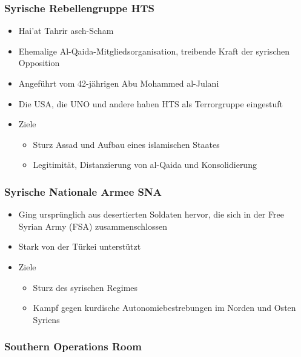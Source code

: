 {}\documentclass[a4paper]{article}
\providecommand{\tightlist}{\setlength{\itemsep}{1mm}\setlength{\parskip}{1mm}}
\begin{document}
\subsubsection{Syrische Rebellengruppe
	HTS}\label{syrische-rebellengruppe-hts}

\begin{itemize}
	\tightlist
	\item
	      Hai'at Tahrir asch-Scham
	\item
	      Ehemalige Al-Qaida-Mitgliedsorganisation, treibende Kraft der
	      syrischen Opposition
	\item
	      Angeführt vom 42-jährigen Abu Mohammed al-Julani
	\item
	      Die USA, die UNO und andere haben HTS als Terrorgruppe eingestuft
	\item
	      Ziele

	      \begin{itemize}
		      \tightlist
		      \item
		            Sturz Assad und Aufbau eines islamischen Staates
		      \item
		            Legitimität, Distanzierung von al-Qaida und Konsolidierung
	      \end{itemize}
\end{itemize}

\subsubsection{Syrische Nationale Armee
	SNA}\label{syrische-nationale-armee-sna}

\begin{itemize}
	\tightlist
	\item
	      Ging ursprünglich aus desertierten Soldaten hervor, die sich in der
	      Free Syrian Army (FSA) zusammenschlossen
	\item
	      Stark von der Türkei unterstützt
	\item
	      Ziele

	      \begin{itemize}
		      \tightlist
		      \item
		            Sturz des syrischen Regimes
		      \item
		            Kampf gegen kurdische Autonomiebestrebungen im Norden und Osten
		            Syriens
	      \end{itemize}
\end{itemize}

\subsubsection{Southern Operations Room}\label{southern-operations-room}
\end{document}
